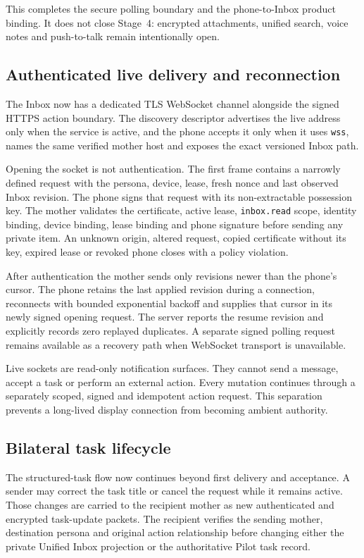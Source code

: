 This completes the secure polling boundary and the phone-to-Inbox product binding.  It does not
close Stage~4: encrypted attachments, unified search, voice notes and push-to-talk remain
intentionally open.

\subsection{Authenticated live delivery and reconnection}

The Inbox now has a dedicated TLS WebSocket channel alongside the signed HTTPS action boundary.
The discovery descriptor advertises the live address only when the service is active, and the
phone accepts it only when it uses \texttt{wss}, names the same verified mother host and exposes
the exact versioned Inbox path.

Opening the socket is not authentication.  The first frame contains a narrowly defined request
with the persona, device, lease, fresh nonce and last observed Inbox revision.  The phone signs
that request with its non-extractable possession key.  The mother validates the certificate,
active lease, \texttt{inbox.read} scope, identity binding, device binding, lease binding and phone
signature before sending any private item.  An unknown origin, altered request, copied
certificate without its key, expired lease or revoked phone closes with a policy violation.

After authentication the mother sends only revisions newer than the phone's cursor.  The phone
retains the last applied revision during a connection, reconnects with bounded exponential
backoff and supplies that cursor in its newly signed opening request.  The server reports the
resume revision and explicitly records zero replayed duplicates.  A separate signed polling
request remains available as a recovery path when WebSocket transport is unavailable.

Live sockets are read-only notification surfaces.  They cannot send a message, accept a task or
perform an external action.  Every mutation continues through a separately scoped, signed and
idempotent action request.  This separation prevents a long-lived display connection from
becoming ambient authority.

\subsection{Bilateral task lifecycle}

The structured-task flow now continues beyond first delivery and acceptance.  A sender may
correct the task title or cancel the request while it remains active.  Those changes are carried
to the recipient mother as new authenticated and encrypted task-update packets.  The recipient
verifies the sending mother, destination persona and original action relationship before changing
either the private Unified Inbox projection or the authoritative Pilot task record.

